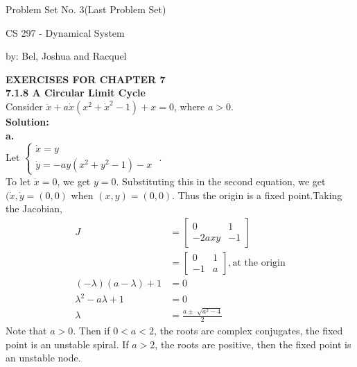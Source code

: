 \documentclass[12pt]{article}
\newtheorem{theorem}{THEOREM}
\begin{document}
\centerline{{\sc Problem Set No. 3(Last Problem Set)}}
\bigskip
\centerline{CS 297 - Dynamical System}
\centerline{by: Bel, Joshua and Racquel}

\bigskip\noindent
{\bf EXERCISES FOR CHAPTER 7 }\\
{\bf 7.1.8 A Circular Limit Cycle} \\
Consider $\ddot{x} + a\dot{x}(x^2+\dot{x}^2-1)+x = 0$, where $a > 0$.
\\{\bf Solution: }\\
\indent
{\bf a. }\\ 

Let $\begin{cases} \dot{x}=y \\ \dot{y}=-ay(x^2 + y^2 -1) -x \end{cases}$ . \\

To let $\dot{x}=0$, we get $y = 0$. Substituting this in the second equation, we get $(\dot{x},\dot{y} = (0,0)$ when $(x,y) = (0,0)$. Thus the origin is a fixed point.Taking the Jacobian, \\
\begin{align*}
J&=\begin{bmatrix}
0 & 1\\
-2axy & -1
\end{bmatrix}\\
&= \begin{bmatrix}
0 & 1\\
-1 & a
\end{bmatrix},\text{at the origin}\\
(-\lambda)(a-\lambda) + 1 &= 0\\
\lambda^2 -a\lambda + 1 &=0\\
\lambda &= \frac{a \pm \sqrt[]{a^2-4}}{2}
\end{align*}
Note that $a > 0$. Then if $0 < a < 2$, the roots are complex conjugates, the fixed point is an unstable spiral. If $a > 2$, the roots are positive, then the fixed point is an unstable node.\\
\end{document}
